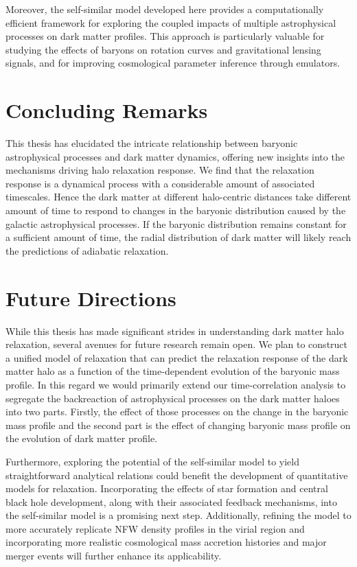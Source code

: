 Moreover, the self-similar model developed here provides a computationally efficient framework for exploring the coupled impacts of multiple astrophysical processes on dark matter profiles. This approach is particularly valuable for studying the effects of baryons on rotation curves and gravitational lensing signals, and for improving cosmological parameter inference through emulators.



\section{Concluding Remarks}
This thesis has elucidated the intricate relationship between baryonic astrophysical processes and dark matter dynamics, offering new insights into the mechanisms driving halo relaxation response. We find that the relaxation response is a dynamical process with a considerable amount of associated timescales. Hence the dark matter at different halo-centric distances take different amount of time to respond to changes in the baryonic distribution caused by the galactic astrophysical processes. If the baryonic distribution remains constant for a sufficient amount of time, the radial distribution of dark matter will likely reach the predictions of adiabatic relaxation. 

\section{Future Directions}
While this thesis has made significant strides in understanding dark matter halo relaxation, several avenues for future research remain open. We plan to construct a unified model of relaxation that can predict the relaxation response of the dark matter halo as a function of the time-dependent evolution of the baryonic mass profile. In this regard we would primarily extend our time-correlation analysis to segregate the backreaction of astrophysical processes on the dark matter haloes into two parts. Firstly, the effect of those processes on the change in the baryonic mass profile and the second part is the effect of changing baryonic mass profile on the evolution of dark matter profile.


Furthermore, exploring the potential of the self-similar model to yield straightforward analytical relations could benefit the development of quantitative models for relaxation. Incorporating the effects of star formation and central black hole development, along with their associated feedback mechanisms, into the self-similar model is a promising next step. Additionally, refining the model to more accurately replicate NFW density profiles in the virial region and incorporating more realistic cosmological mass accretion histories and major merger events will further enhance its applicability.
